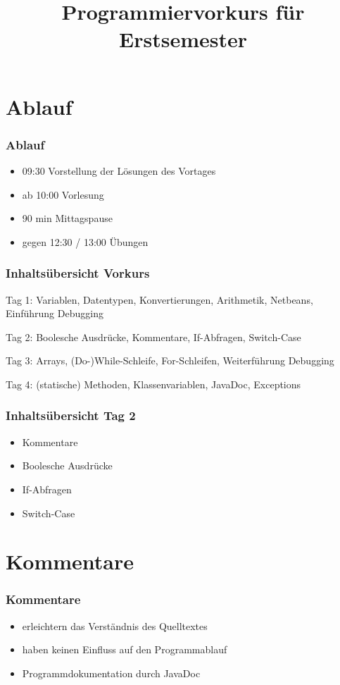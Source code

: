 \documentclass[final]{beamer}
\title{Programmiervorkurs für Erstsemester}
\begin{document}



\begin{frame}
	\titlepage
\end{frame}

\section{Ablauf}
\begin{frame}
	\frametitle{Ablauf}
	\begin{itemize}
		\item{09:30 Vorstellung der Lösungen des Vortages}
		\item{ab 10:00 Vorlesung}
		\item{90 min Mittagspause}
		\item{gegen 12:30 / 13:00 Übungen}
	\end{itemize}
\end{frame}

\begin{frame}
	\frametitle{Inhaltsübersicht Vorkurs}
	\begin{itemize}
	{\color{gray}
		\item {Tag 1: Variablen, Datentypen, Konvertierungen, Arithmetik, Netbeans, Einführung Debugging}
		{\color{black}
		\item {Tag 2: Boolesche Ausdrücke, Kommentare, If-Abfragen, Switch-Case}
		}
		\item {Tag 3: Arrays, (Do-)While-Schleife, For-Schleifen, Weiterführung Debugging}
		\item {Tag 4: (statische) Methoden, Klassenvariablen, JavaDoc, Exceptions}
	}
	\end{itemize}
\end{frame}

\begin{frame}
	\frametitle{Inhaltsübersicht Tag 2}
	\begin{itemize}
		\item {Kommentare}
		\item {Boolesche Ausdrücke}
		\item {If-Abfragen}
		\item {Switch-Case}
	\end{itemize}
\end{frame}

\section{Kommentare}
\begin{frame}
	\frametitle{Kommentare}
	\begin{itemize}
		\item{erleichtern das Verständnis des Quelltextes}
		\item{haben keinen Einfluss auf den Programmablauf}
		\item{Programmdokumentation durch JavaDoc}
	\end{itemize}
\end{frame}
\end{document}
